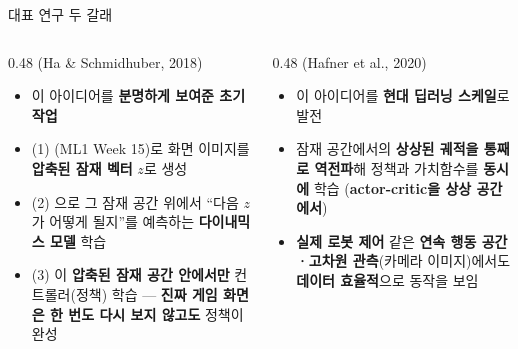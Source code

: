 \begin{frame}{대표 연구 두 갈래}
  \begin{columns}[T]
    \begin{column}{0.48\textwidth}
       (Ha \& Schmidhuber, 2018)
      \begin{itemize}
        \item 이 아이디어를 \textbf{분명하게 보여준 초기
          작업}
        \item (1) (ML1 Week 15)로 화면 이미지를
          \textbf{압축된 잠재 벡터} $z$로 생성
        \item (2) 으로 그 잠재 공간 위에서
          ``다음 $z$가 어떻게 될지''를 예측하는
          \textbf{다이내믹스 모델} 학습
        \item (3) 이 \textbf{압축된 잠재 공간 안에서만}
          컨트롤러(정책) 학습 --- \textbf{진짜 게임 화면은
          한 번도 다시 보지 않고도} 정책이 완성
      \end{itemize}
    \end{column}
    \begin{column}{0.48\textwidth}
       (Hafner et al., 2020)
      \begin{itemize}
        \item 이 아이디어를 \textbf{현대 딥러닝 스케일}로
          발전
        \item 잠재 공간에서의 \textbf{상상된 궤적을 통째로
          역전파}해 정책과 가치함수를 \textbf{동시에} 학습
          (\textbf{actor-critic을 상상 공간에서})
        \item \textbf{실제 로봇 제어} 같은 \textbf{연속 행동
          공간·고차원 관측}(카메라 이미지)에서도
          \textbf{데이터 효율적}으로 동작을 보임
      \end{itemize}
    \end{column}
  \end{columns}
\end{frame}
